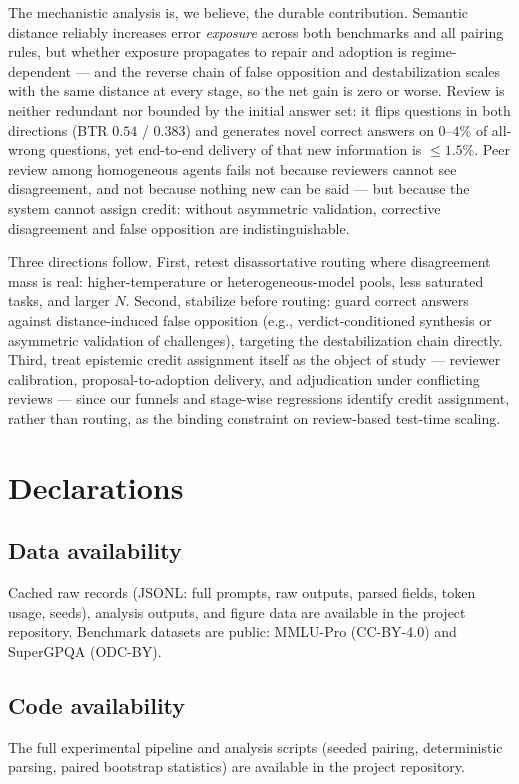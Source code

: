 \documentclass[11pt]{article}
\begin{document}
The mechanistic analysis is, we believe, the durable contribution. Semantic distance reliably increases error \emph{exposure} across both benchmarks and all pairing rules, but whether exposure propagates to repair and adoption is regime-dependent --- and the reverse chain of false opposition and destabilization scales with the same distance at every stage, so the net gain is zero or worse. Review is neither redundant nor bounded by the initial answer set: it flips questions in both directions (BTR $0.54$ / $0.383$) and generates novel correct answers on $0$--$4\%$ of all-wrong questions, yet end-to-end delivery of that new information is $\le 1.5\%$. Peer review among homogeneous agents fails not because reviewers cannot see disagreement, and not because nothing new can be said --- but because the system cannot assign credit: without asymmetric validation, corrective disagreement and false opposition are indistinguishable.

Three directions follow. First, retest disassortative routing where disagreement mass is real: higher-temperature or heterogeneous-model pools, less saturated tasks, and larger $N$. Second, stabilize before routing: guard correct answers against distance-induced false opposition (e.g., verdict-conditioned synthesis or asymmetric validation of challenges), targeting the destabilization chain directly. Third, treat epistemic credit assignment itself as the object of study --- reviewer calibration, proposal-to-adoption delivery, and adjudication under conflicting reviews --- since our funnels and stage-wise regressions identify credit assignment, rather than routing, as the binding constraint on review-based test-time scaling.


\section*{Declarations}

\subsection*{Data availability}
Cached raw records (JSONL: full prompts, raw outputs, parsed fields, token usage, seeds), analysis outputs, and figure data are available in the project repository. Benchmark datasets are public: MMLU-Pro (CC-BY-4.0) and SuperGPQA (ODC-BY).

\subsection*{Code availability}
The full experimental pipeline and analysis scripts (seeded pairing, deterministic parsing, paired bootstrap statistics) are available in the project repository.
\end{document}
